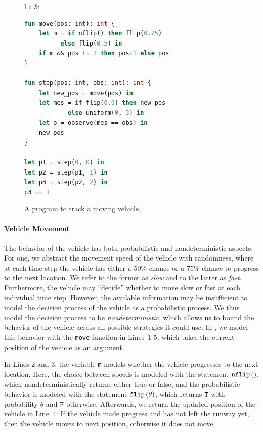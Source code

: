 \begin{figure}%
	\vspace*{-1.5\intextsep}
	\begin{center}
		\begin{tabular}{l c}
			&
			\begin{lstlisting}[language=Caml]
fun move(pos: int): int {
	let m = if nflip() then flip(0.75) 
          else flip(0.5) in 
	if m && pos != 2 then pos+1 else pos  
}

fun step(pos: int, obs: int): int {
	let new_pos = move(pos) in
	let mes = if flip(0.9) then new_pos 
            else uniform(0, 3) in
	let o = observe(mes == obs) in
	new_pos   
}

let p1 = step(0, 0) in
let p2 = step(p1, 1) in
let p3 = step(p2, 2) in
p3 == 1
\end{lstlisting}
		\end{tabular}
	\end{center}
	\vspace*{-.5em}%
	\caption{A \NDICE program to track a moving vehicle.}
	\label{fig:plane}
\end{figure}%
%
\paragraph{Vehicle Movement}
The behavior of the vehicle has both probabilistic and nondeterministic aspects:
For one, we abstract the movement speed of the vehicle with randomness, where at each time step the vehicle has either a 50\% chance or a 75\% chance to progress to the next location. 
We refer to the former as \textit{slow} and to the latter as \textit{fast}.
Furthermore, the vehicle may \enquote{decide} whether to move slow or fast at each individual time step.
However, the available information may be insufficient to model the decision process of the vehicle as a probabilistic process.
We thus model the decision process to be \textit{nondeterministic}, which allows us to bound the behavior of the vehicle across all possible strategies it could use.
In , we model this behavior with the \texttt{move} function in Lines~1-5, which takes the current position of the vehicle as an argument.

In Lines 2 and 3, the variable \texttt{m} models whether the vehicle progresses to the next location. 
Here, the choice between speeds is modeled with the statement $\texttt{nflip}\left(\right) $, which nondeterministically returns either true or false, and the probabilistic behavior is modeled with the statement $\texttt{flip} \left(\theta\right) $, which returns $\texttt{T}$ with probability $\theta$ and $\texttt{F}$ otherwise.
Afterwards, we return the updated position of the vehicle in Line~4:
If the vehicle made progress and has not left the runway yet, then the vehicle moves to next position, otherwise it does not move.


